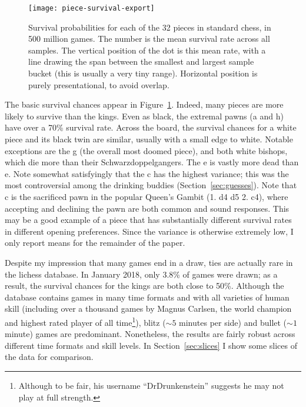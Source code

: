 \documentclass[twocolumn]{article}
\newcommand{\Pawn}[1][1.3ex]{%
\adjustbox{Trim=4.3pt 2.6pt 4.3pt 0pt,width=#1,margin=0.2ex 0ex 0.2ex 0ex}{\BlackPawnOnWhite}%
}%
\begin{document}
\begin{figure}[t]
  \begin{center}
    \texttt{[image: piece-survival-export]}
  \end{center}\vspace{-0.1in}
  \caption{Survival probabilities for each of the 32 pieces in standard
    chess, in 500 million games. The number is the mean survival rate
    across all samples. The vertical position of the dot is this mean
    rate, with a line drawing the span between the smallest and largest
    sample bucket (this is usually a very tiny range).
    Horizontal position is purely presentational, to avoid overlap.}
  \label{fig:piece-survival}
\end{figure}

The basic survival chances appear in Figure~\ref{fig:piece-survival}.
Indeed, many pieces are more likely to survive than the kings. Even as
black, the extremal pawns (\pawn a and \pawn h) have over a 70\%
survival rate. Across the board, the survival chances for a white
piece and its black twin are similar, usually with a small edge to
white. Notable exceptions are the \knight g (the overall most doomed
piece), and both white bishops, which die more than their
Schwarzdoppelgangers. The \pawn e is vastly more dead than \Pawn e.
Note somewhat satisfyingly that the \pawn c has the highest variance;
this was the most controversial among the drinking buddies
(Section~\ref{sec:guesses}). Note that \pawn c is the sacrificed
pawn in the popular Queen's Gambit (1. d4 d5 2. c4), where accepting
and declining the pawn are both common and sound responses. This may
be a good example of a piece that has substantially different survival
rates in different opening preferences. Since the variance is
otherwise extremely low, I only report means for the remainder of the
paper.

Despite my impression that many games end in a draw, ties are actually
rare in the lichess database. In January 2018, only 3.8\% of games
were drawn;
as a result, the survival chances for the kings are both close to
50\%. Although the database contains games in many time formats and
with all varieties of human skill (including over a thousand games by
Magnus Carlsen, the world champion and highest rated player of all
time\footnote{Although to be fair, his username ``DrDrunkenstein''
  suggests he may not play at full strength.}), blitz ($\sim\! 5$
minutes per side) and bullet ($\sim\! 1$ minute) games are
predominant. Nonetheless, the results are fairly robust across
different time formats and skill levels. In Section~\ref{sec:slices} I
show some slices of the data for comparison.
\end{document}

